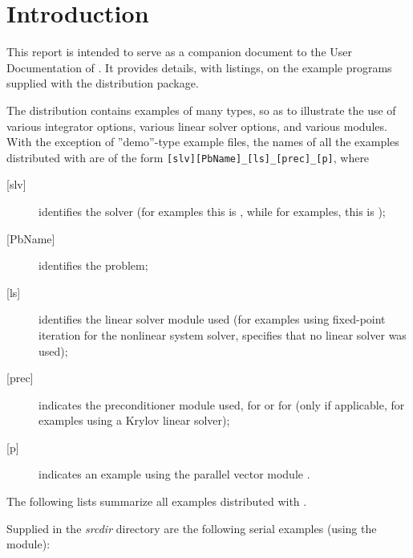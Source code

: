 \section{Introduction}\label{s:ex_intro}

This report is intended to serve as a companion document to the User
Documentation of {\cvode} \cite{cvode_ug}.  It provides details, with
listings, on the example programs supplied with the {\cvode} distribution
package.

The {\cvode} distribution contains examples of many types, so as to
illustrate the use of various integrator options, various linear solver
options, and various {\nvector} modules.
With the exception of ''demo''-type example files, the names of all the examples
distributed with {\sundials} are of the form \verb![slv][PbName]_[ls]_[prec]_[p]!,
where
\begin{description}
\item [{[slv]}] identifies the solver (for {\cvode} examples this is ,
  while for {\fcvode} examples, this is );
\item [{[PbName]}] identifies the problem;
\item [{[ls]}] identifies the linear solver module used (for examples using
  fixed-point iteration for the nonlinear system solver,  specifies
  that no linear solver was used);
\item [{[prec]}] indicates the {\cvode} preconditioner module used,  for {\cvbandpre}
  or  for {\cvbbdpre}
  (only if applicable, for examples using a Krylov linear solver);
\item [{[p]}] indicates an example using the parallel vector module {\nvecp}.
\end{description}

\vspace{0.2in}\noindent
The following lists summarize all examples distributed with {\cvode}.

\vspace{0.2in}\noindent
Supplied in the {\em srcdir} directory are the
following serial examples (using the {\nvecs} module):

